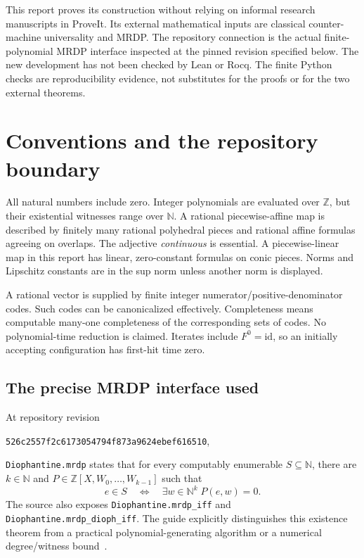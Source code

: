 \documentclass[11pt,letterpaper]{article}
\numberwithin{equation}{section}
\theoremstyle{definition}
\theoremstyle{remark}
\newcommand{\N}{\mathbb N}
\newcommand{\Z}{\mathbb Z}
\newcommand{\code}[1]{\nolinkurl{#1}}
\newcommand{\srcmark}[1]{\par\noindent{\small\itshape [source~#1]}\par}
\begin{document}
This report proves its construction without relying on informal research
manuscripts in ProveIt. Its external mathematical inputs are classical
counter-machine universality and MRDP. The repository connection is the
actual finite-polynomial MRDP interface inspected at the pinned revision
specified below. The new development has not been checked by Lean or Rocq.
The finite Python checks are reproducibility evidence, not substitutes for
the proofs or for the two external theorems.

\section{Conventions and the repository boundary}\label{pqc:sc:sec:boundary}
\srcmark{14}

All natural numbers include zero. Integer polynomials are evaluated over
$\Z$, but their existential witnesses range over $\N$. A rational
piecewise-affine map is described by finitely many rational polyhedral pieces
and rational affine formulas agreeing on overlaps. The adjective
\emph{continuous} is essential. A piecewise-linear map in this report has
linear, zero-constant formulas on conic pieces. Norms and Lipschitz constants
are in the sup norm unless another norm is displayed.

A rational vector is supplied by finite integer numerator/positive-denominator
codes. Such codes can be canonicalized effectively. Completeness means
computable many-one completeness of the corresponding sets of codes. No
polynomial-time reduction is claimed. Iterates include $F^0=\mathrm{id}$, so
an initially accepting configuration has first-hit time zero.

\subsection{The precise MRDP interface used}

At repository revision
\begin{center}
\small\code{526c2557f2c6173054794f873a9624ebef616510},
\end{center}
\code{Diophantine.mrdp} states that for every computably enumerable
$S\subseteq\N$, there are $k\in\N$ and
$P\in\Z[X,W_0,\ldots,W_{k-1}]$ such that
\begin{equation}\label{pqc:sc:eq:mrdp}
 e\in S\quad\Longleftrightarrow\quad
 \exists w\in\N^k\;P(e,w)=0.
\end{equation}
The source also exposes \code{Diophantine.mrdp_iff} and
\code{Diophantine.mrdp_dioph_iff}. The guide explicitly distinguishes this
existence theorem from a practical polynomial-generating algorithm or a
numerical degree/witness bound~\cite{b62s14-proveit-mrdp,b62s14-proveit-guide}.
\end{document}
